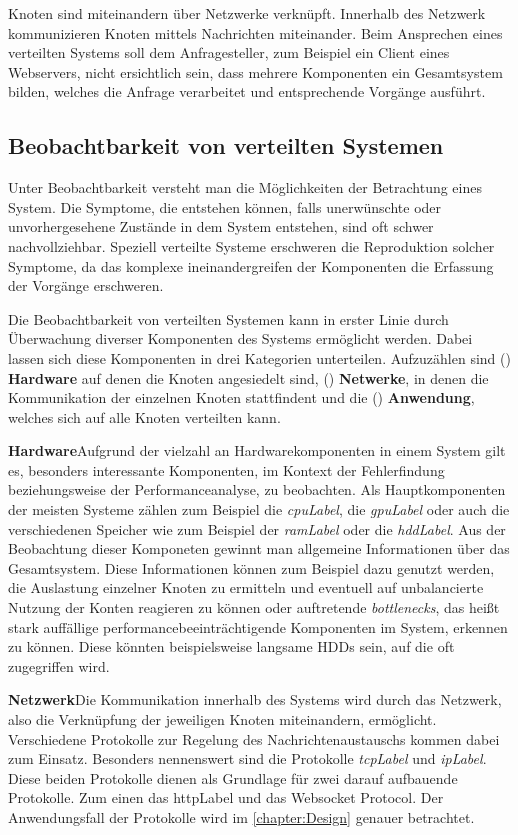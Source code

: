 	Knoten sind miteinandern über Netzwerke verknüpft. Innerhalb des Netzwerk kommunizieren Knoten mittels Nachrichten miteinander. Beim Ansprechen eines verteilten Systems soll dem Anfragesteller, zum Beispiel ein Client eines Webservers, nicht ersichtlich sein, dass mehrere Komponenten ein Gesamtsystem bilden, welches die Anfrage verarbeitet und entsprechende Vorgänge ausführt. 
\subsection{Beobachtbarkeit von verteilten Systemen}
\label{subsection:Beobachtbarkeit von verteilten Systemen}
	Unter Beobachtbarkeit versteht man die Möglichkeiten der Betrachtung eines System. Die Symptome, die entstehen können, falls unerwünschte oder unvorhergesehene Zustände in dem System entstehen, sind oft schwer nachvollziehbar. Speziell verteilte Systeme erschweren die Reproduktion solcher Symptome, da das komplexe ineinandergreifen der Komponenten die Erfassung der Vorgänge erschweren. 

	Die Beobachtbarkeit von verteilten Systemen kann in erster Linie durch Überwachung diverser Komponenten des Systems ermöglicht werden. Dabei lassen sich diese Komponenten in drei Kategorien unterteilen. Aufzuzählen sind () \textbf{Hardware} auf denen die Knoten angesiedelt sind, () \textbf{Netwerke}, in denen die Kommunikation der einzelnen Knoten stattfindent und die () \textbf{Anwendung}, welches sich auf alle Knoten verteilten kann.

	
	\textbf{Hardware}\space\space\space Aufgrund der vielzahl an Hardwarekomponenten in einem System gilt es, besonders interessante Komponenten, im Kontext der Fehlerfindung beziehungsweise der Performanceanalyse, zu beobachten. Als Hauptkomponenten der meisten Systeme zählen zum Beispiel die \emph{\gls{cpuLabel}}, die \emph{\gls{gpuLabel}} oder auch die verschiedenen Speicher wie zum Beispiel der \emph{\gls{ramLabel}} oder die \emph{\gls{hddLabel}}. Aus der Beobachtung dieser Komponeten gewinnt man allgemeine Informationen über das Gesamtsystem. Diese Informationen können zum Beispiel dazu genutzt werden, die Auslastung einzelner Knoten zu ermitteln und eventuell auf unbalancierte Nutzung der Konten reagieren zu können oder auftretende \emph{bottlenecks}, das heißt stark auffällige performancebeeinträchtigende Komponenten im System, erkennen zu können. Diese könnten beispielsweise langsame HDDs sein, auf die oft zugegriffen wird.
	
	\textbf{Netzwerk}\space\space\space Die Kommunikation innerhalb des Systems wird durch das Netzwerk, also die Verknüpfung der jeweiligen Knoten miteinandern, ermöglicht. Verschiedene Protokolle zur Regelung des Nachrichtenaustauschs kommen dabei zum Einsatz. Besonders nennenswert sind die Protokolle \emph{\gls{tcpLabel}} und \emph{\gls{ipLabel}}. Diese beiden Protokolle dienen als Grundlage für zwei darauf aufbauende Protokolle. Zum einen das \gls{httpLabel} und das Websocket Protocol. Der Anwendungsfall der Protokolle wird im \cref{chapter:Design} genauer betrachtet.
	
